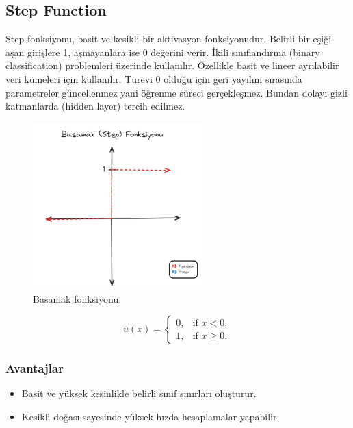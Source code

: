 \newpage

\subsection{Step Function}
Step fonksiyonu, basit ve kesikli bir aktivasyon fonksiyonudur. Belirli bir eşiği aşan girişlere 1, aşmayanlara ise 0 değerini verir. İkili sınıflandırma (binary classification) problemleri üzerinde kullanılır. Özellikle basit ve lineer ayrılabilir veri kümeleri için kullanılır. Türevi 0 olduğu için geri yayılım sırasında parametreler güncellenmez yani öğrenme süreci gerçekleşmez. Bundan dolayı gizli katmanlarda (hidden layer) tercih edilmez.

\begin{figure}[h]
    \centering
    \includegraphics[width=0.6\textwidth]{images/step_function.png}
    \caption{Basamak fonksiyonu.}
    \label{fig:enter-label}
\end{figure}

\[u(x) = \begin{cases} 
0, & \text{if } x < 0, \\ 
1, & \text{if } x \geq 0. 
\end{cases}\]

\subsubsection{Avantajlar}
\begin{itemize}
    \item Basit ve yüksek kesinlikle belirli sınıf sınırları oluşturur.
    \item Kesikli doğası sayesinde yüksek hızda hesaplamalar yapabilir. 
\end{itemize}

